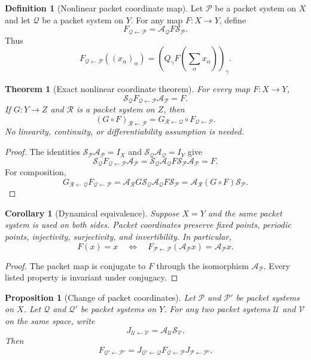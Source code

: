\documentclass{aomart}
\newtheorem{theorem}{Theorem}[section]
\newtheorem{proposition}[proposition]{Proposition}
\newtheorem{corollary}[corollary]{Corollary}
\theoremstyle{definition}
\newtheorem{definition}[definition]{Definition}
\theoremstyle{remark}
\newcommand{\Acal}{\mathcal A}
\newcommand{\Pcal}{\mathcal P}
\newcommand{\Qcal}{\mathcal Q}
\newcommand{\Rcal}{\mathcal R}
\newcommand{\Scal}{\mathcal S}
\newcommand{\Ucal}{\mathcal U}
\newcommand{\Vcal}{\mathcal V}
\begin{document}
\begin{definition}[Nonlinear packet coordinate map]\label{def:nonlinear_packet_map}
Let $\Pcal$ be a packet system on $X$ and let $\Qcal$ be a packet system on $Y$.  For any map $F:X\to Y$, define
\[
F_{\Qcal\leftarrow\Pcal}
=
\Acal_{\Qcal}F\Scal_{\Pcal}.
\]
Thus
\[
F_{\Qcal\leftarrow\Pcal}((x_\alpha)_\alpha)
=
\left(
Q_\gamma F\left(\sum_\alpha x_\alpha\right)
\right)_\gamma.
\]
\end{definition}

\begin{theorem}[Exact nonlinear coordinate theorem]\label{thm:exact_nonlinear_coordinates}
For every map $F:X\to Y$,
\[
\Scal_{\Qcal}F_{\Qcal\leftarrow\Pcal}\Acal_{\Pcal}=F.
\]
If $G:Y\to Z$ and $\Rcal$ is a packet system on $Z$, then
\[
(G\circ F)_{\Rcal\leftarrow\Pcal}
=
G_{\Rcal\leftarrow\Qcal}
\circ
F_{\Qcal\leftarrow\Pcal}.
\]
No linearity, continuity, or differentiability assumption is needed.
\end{theorem}

\begin{proof}
The identities $\Scal_{\Pcal}\Acal_{\Pcal}=I_X$ and $\Scal_{\Qcal}\Acal_{\Qcal}=I_Y$ give
\[
\Scal_{\Qcal}F_{\Qcal\leftarrow\Pcal}\Acal_{\Pcal}
=
\Scal_{\Qcal}\Acal_{\Qcal}F\Scal_{\Pcal}\Acal_{\Pcal}
=F.
\]
For composition,
\[
G_{\Rcal\leftarrow\Qcal}F_{\Qcal\leftarrow\Pcal}
=
\Acal_{\Rcal}G\Scal_{\Qcal}\Acal_{\Qcal}F\Scal_{\Pcal}
=
\Acal_{\Rcal}(G\circ F)\Scal_{\Pcal}.
\]
\end{proof}

\begin{corollary}[Dynamical equivalence]\label{cor:dynamical_equivalence}
Suppose $X=Y$ and the same packet system is used on both sides.  Packet coordinates preserve fixed points, periodic points, injectivity, surjectivity, and invertibility.  In particular,
\[
F(x)=x
\quad\Longleftrightarrow\quad
F_{\Pcal\leftarrow\Pcal}(\Acal_{\Pcal}x)=\Acal_{\Pcal}x.
\]
\end{corollary}

\begin{proof}
The packet map is conjugate to $F$ through the isomorphism $\Acal_{\Pcal}$.  Every listed property is invariant under conjugacy.
\end{proof}

\begin{proposition}[Change of packet coordinates]\label{prop:change_packet_coordinates}
Let $\Pcal$ and $\Pcal'$ be packet systems on $X$.  Let $\Qcal$ and $\Qcal'$ be packet systems on $Y$.  For any two packet systems $\Ucal$ and $\Vcal$ on the same space, write
\[
J_{\Ucal\leftarrow\Vcal}
=
\Acal_{\Ucal}\Scal_{\Vcal}.
\]
Then
\[
F_{\Qcal'\leftarrow\Pcal'}
=
J_{\Qcal'\leftarrow\Qcal}
F_{\Qcal\leftarrow\Pcal}
J_{\Pcal\leftarrow\Pcal'}.
\]
\end{proposition}
\end{document}
